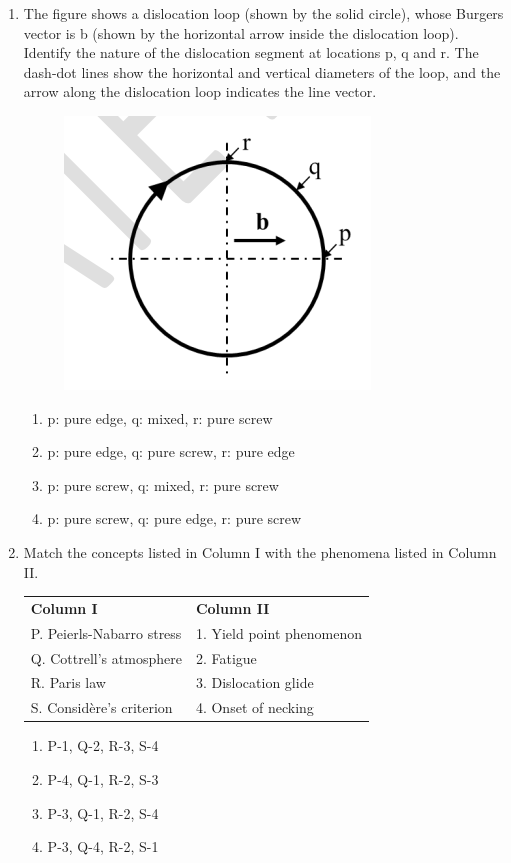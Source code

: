 \documentclass[journal]{IEEEtran}
\theoremstyle{remark}
\begin{document}
\begin{enumerate}[resume]
\item The figure shows a dislocation loop (shown by the solid circle), whose Burgers vector is b (shown by the horizontal arrow inside the dislocation loop). Identify the nature of the dislocation segment at locations p, q and r. The dash-dot lines show the horizontal and vertical diameters of the loop, and the arrow along the dislocation loop indicates the line vector. \hfill{}
\begin{figure}[H]
    \centering
    \includegraphics[width=0.3\columnwidth]{figs/Q.24.png}
    \caption{}
    \label{fig:placeholder}
\end{figure}
\begin{enumerate}
\item p: pure edge, q: mixed, r: pure screw
\item p: pure edge, q: pure screw, r: pure edge
\item p: pure screw, q: mixed, r: pure screw
\item p: pure screw, q: pure edge, r: pure screw
\end{enumerate}

\item Match the concepts listed in Column I with the phenomena listed in Column II. \hfill{}
\begin{center}
\begin{tabular}{ll}
\textbf{Column I} & \textbf{Column II} \\
P. Peierls-Nabarro stress & 1. Yield point phenomenon \\
Q. Cottrell's atmosphere & 2. Fatigue \\
R. Paris law & 3. Dislocation glide \\
S. Considère's criterion & 4. Onset of necking \\
\end{tabular}
\end{center}
\begin{enumerate}
\item P-1, Q-2, R-3, S-4
\item P-4, Q-1, R-2, S-3
\item P-3, Q-1, R-2, S-4
\item P-3, Q-4, R-2, S-1
\end{enumerate}


\end{enumerate}
\end{document}
